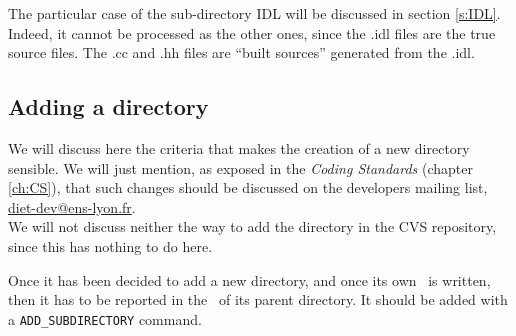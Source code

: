 \noindent
{} The particular case of the sub-directory
\textsf{IDL} will be discussed in section \ref{s:IDL}. Indeed, it
cannot be processed as the other ones, since the \textsf{.idl} files
are the true source files. The \textsf{.cc} and \textsf{.hh} files are
``built sources'' generated from the \textsf{.idl}.



\subsection{Adding a directory}

We will discuss here the criteria that makes the creation of a new
directory sensible. We will just mention, as exposed in the
\textit{Coding Standards} (chapter \ref{ch:CS}), that such changes
should be discussed on the developers mailing list,
\url{diet-dev@ens-lyon.fr}.  \\ We will not discuss neither the way to
add the directory in the CVS repository, since this has nothing to do
here.

Once it has been decided to add a new directory, and once its own
\CMakeLists\ is written, then it has to be reported
in the \CMakeLists\ of its parent directory.
It should be added with a \texttt{ADD\_SUBDIRECTORY} command.
